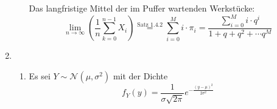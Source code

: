 \documentclass[a4paper]{scrartcl}
\def \blattnr {5}
\begin{document}
\begin{enumerate}[label=\bfseries \blattnr.\arabic*]
\begin{enumerate}
            Das langfristige Mittel der im Puffer wartenden Werkstücke:
            \begin{equation*}
                \lim_{n \to \infty} \left( \frac{1}{n} \sum_{k=0}^{n-1} X_i \right)
                \stackrel{\text{Satz 1.4.2}}{=} \sum_{i=0}^M i \cdot \pi_i
                = \frac{\sum_{i=0}^M i \cdot q^i}{1 + q + q^2 + \dotsb q^M}
            \end{equation*}

        \end{enumerate}
   
    \item
        \begin{enumerate}
            \item
	      Es sei $Y \sim \mathcal{N}(\mu, \sigma^2)$ mit der Dichte
	      \begin{equation*}
		  f_Y(y) = \frac1{\sigma\sqrt{2\pi}} e^{-\frac{(y-\mu)^2}{2\sigma^2}}
	      \end{equation*}
	      

\end{enumerate}
\end{enumerate}
\end{document}
